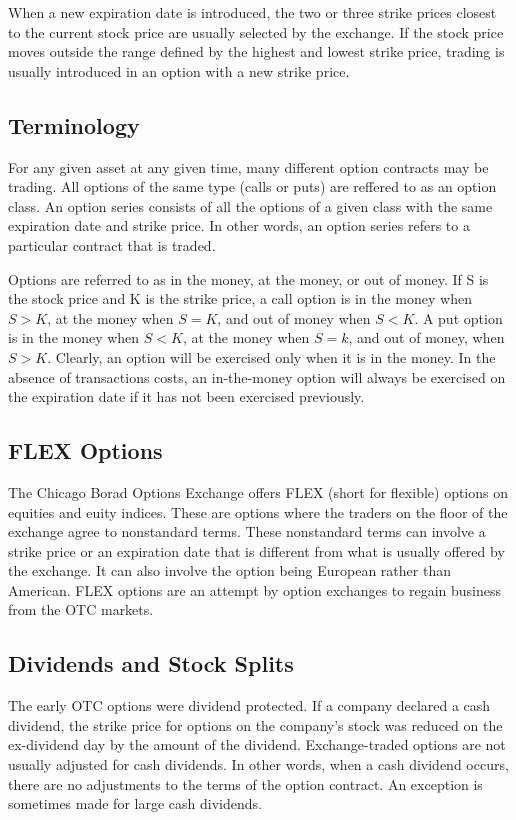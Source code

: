 \documentclass{article}
\begin{document}
When a new expiration date is introduced, the two or three strike prices closest to the current stock price are usually selected by the exchange. If the stock price moves outside the range defined by the highest and lowest strike price, trading is usually introduced in an option with a new strike price.

\subsection{Terminology}
For any given asset at any given time, many different option contracts may be trading. All options of the same type (calls or puts) are reffered to  as an option class. An option series consists of all the options of a given class with the same expiration date and strike price. In other words, an option series refers to a particular contract that is traded.

Options are referred to as in the money, at the money, or out of money. If S is the stock price and K is the strike price, a call option is in the money when $ S>K $, at the money when $ S=K $, and out of money when $ S<K $. A put option is in the money when $ S<K $, at the money when $ S=k $, and out of money, when $ S>K $. Clearly, an option will be exercised only when it is in the money. In the absence of transactions costs, an in-the-money option will always be exercised on the expiration date if it has not been exercised previously.

\subsection{FLEX Options}
The Chicago Borad Options Exchange offers FLEX (short for flexible) options on equities and euity indices. These are options where the traders on the floor of the exchange agree to nonstandard terms. These nonstandard terms can involve a strike price or an expiration date that is different from what is usually offered by the exchange. It can also involve the option being European rather than American. FLEX options are an attempt by option exchanges to regain business from the OTC markets.

\subsection{Dividends and Stock Splits}
The early OTC options were dividend protected. If a company declared a cash dividend, the strike price for options on the company's stock was reduced on the ex-dividend day by the amount of the dividend. Exchange-traded options are not usually adjusted for cash dividends. In other words, when a cash dividend occurs, there are no adjustments to the terms of the option contract. An exception is sometimes made for large cash dividends.
\end{document}
